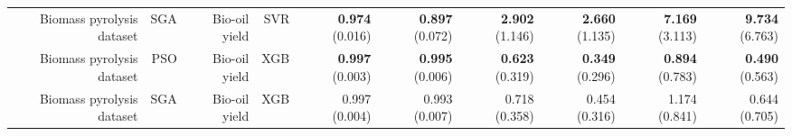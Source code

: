 \begin{table}
\begin{tabular}{rrrrrrrrrr}
Biomass pyrolysis dataset &       SGA & Bio-oil yield &       SVR & { \bf 0.974} (0.016) & { \bf 0.897} (0.072) & { \bf 2.902} (1.146) & { \bf 2.660} (1.135) &  { \bf 7.169} (3.113) &   { \bf 9.734} (6.763) \\
Biomass pyrolysis dataset &       PSO & Bio-oil yield &       XGB & { \bf 0.997} (0.003) & { \bf 0.995} (0.006) & { \bf 0.623} (0.319) & { \bf 0.349} (0.296) &  { \bf 0.894} (0.783) &   { \bf 0.490} (0.563) \\
Biomass pyrolysis dataset &       SGA & Bio-oil yield &       XGB &        0.997 (0.004) &        0.993 (0.007) &        0.718 (0.358) &        0.454 (0.316) &         1.174 (0.841) &          0.644 (0.705) \\
\bottomrule
\end{tabular}
\end{table}
